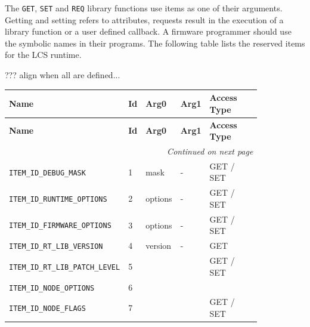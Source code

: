 %

The \texttt{GET}, \texttt{SET} and \texttt{REQ} library functions use items 
as one of their arguments. Getting and setting refers to attributes, requests
result in the execution of a library function or a user defined callback.
A firmware programmer should use the symbolic names in their programs. 
The following table lists the reserved items for the LCS runtime.

??? align when all are defined...

{
\footnotesize

\begin{longtable}{@{}|p{0.4\linewidth}|p{0.06\linewidth}|p{0.08\linewidth}|p{0.08\linewidth}|p{0.22\linewidth}|@{}}
    \toprule
    \textbf{Name} & \textbf{Id} & \textbf{Arg0} & \textbf{Arg1} & \textbf{Access Type} \\
    \midrule
    \midrule
    \endfirsthead
    \toprule
    \textbf{Name} & \textbf{Id} & \textbf{Arg0} & \textbf{Arg1} & \textbf{Access Type} \\
    \midrule
     \midrule
    \endhead
    \midrule
    \multicolumn{5}{r}{\textit{Continued on next page}} \\
    \midrule
    \endfoot
    \bottomrule
    \endlastfoot

    \texttt{ITEM\_ID\_DEBUG\_MASK}       & 1   & mask & - & GET / SET \\
    \midrule

    \texttt{ITEM\_ID\_RUNTIME\_OPTIONS}  & 2   & options & - & GET / SET \\
    \midrule

    \texttt{ITEM\_ID\_FIRMWARE\_OPTIONS} & 3   & options & - & GET / SET \\
    \midrule

    \texttt{ITEM\_ID\_RT\_LIB\_VERSION}   & 4   & version & - & GET \\
    \midrule

    \texttt{ITEM\_ID\_RT\_LIB\_PATCH\_LEVEL} & 5 & & & GET / SET \\
    \midrule

    \texttt{ITEM\_ID\_NODE\_OPTIONS}     & 6   & & & \\
    \midrule

    \texttt{ITEM\_ID\_NODE\_FLAGS}       & 7   & & & GET / SET \\
    \midrule


\end{longtable}}
